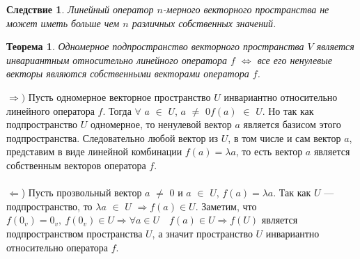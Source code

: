 \newtheorem*{cor11_7_1}{Следствие}\begin{cor11_7_1}Линейный оператор $n$-мерного векторного пространства не может иметь больше чем $n$ различных собственных значений.
\end{cor11_7_1}
\newtheorem*{th11_7_1}{Теорема}\begin{th11_7_1}Одномерное подпространство векторного пространства $V$ является инвариантным относительно линейного оператора $f$ $\Longleftrightarrow$ все его ненулевые векторы являются собственными векторами оператора $f$.
\end{th11_7_1}\begin{Proof}
	$\Rightarrow)$ Пусть одномерное векторное пространство $U$ инвариантно относительно линейного оператора $f$. Тогда $\forall$ $a$ $\in$ $U$, $a$ $\not=$ 0\quad $f(a)$ $\in$ $U$. Но так как подпространство $U$ одномерное, то ненулевой вектор $a$ является базисом этого подпространства. Следовательно любой вектор из $U$, в том числе и сам вектор $a$, представим в виде линейной комбинации $f(a) = \lambda a$, то есть вектор $a$ является собственным векторов оператора $f$.\\\\ $\Leftarrow$) Пусть прозвольный вектор $a$ $\not=$ 0 и $a$ $\in$ $U$, $f(a) = \lambda a$. Так как $U$ --- подпространство, то $\lambda a$ $\in$ $U$ $\Rightarrow f(a) \in U$. Заметим, что $f(0_v) = 0_v,\ f(0_v) \in U \Rightarrow \forall a \in U\quad f(a) \in U\Rightarrow f(U)$ является подпространством пространства $U$, а значит пространство $U$ инвариантно относительно оператора $f$.
\end{Proof}

